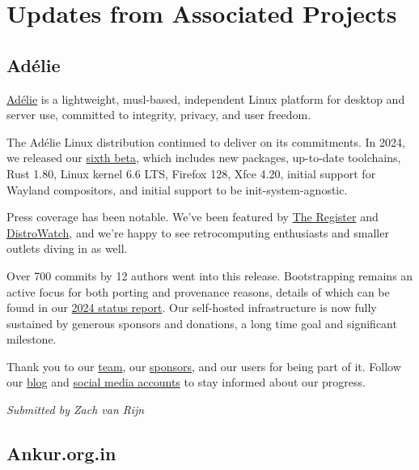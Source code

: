 \documentclass[a4paper]{report}
\begin{document}
\section{Updates from Associated Projects}

\subsection{Adélie}

\href{https://www.adelielinux.org/}{Adélie} is a lightweight, musl-based, independent Linux platform for desktop and server use, committed to integrity, privacy, and user freedom.

The Adélie Linux distribution continued to deliver on its commitments. In 2024, we released our \href{https://blog.adelielinux.org/2024/12/15/adelie-linux-1-0-beta6-released/}{sixth beta}, which includes new packages, up-to-date toolchains, Rust 1.80, Linux kernel 6.6 LTS, Firefox 128, Xfce 4.20, initial support for Wayland compositors, and initial support to be init-system-agnostic.

Press coverage has been notable. We’ve been featured by \href{https://www.theregister.com/2024/12/20/adelie_linux_1_beta_6/}{The Register} and \href{https://distrowatch.com/weekly.php?issue=20240212}{DistroWatch}, and we’re happy to see retrocomputing enthusiasts and smaller outlets diving in as well.

Over 700 commits by 12 authors went into this release. Bootstrapping remains an active focus for both porting and provenance reasons, details of which can be found in our \href{https://blog.adelielinux.org/2024/12/24/2024-state-of-the-adelie-linux-distribution/}{2024 status report}.
Our self-hosted infrastructure is now fully sustained by generous sponsors and donations, a long time goal and significant milestone.

Thank you to our \href{https://git.adelielinux.org/groups/adelie/-/group_members}{team}, our \href{https://www.adelielinux.org/sponsors/}{sponsors}, and our users for being part of it.  Follow our \href{https://blog.adelielinux.org/}{blog} and \href{https://www.adelielinux.org/contact/}{social media accounts} to stay informed about our progress.

{\em Submitted by Zach van Rijn}

\subsection{Ankur.org.in}
\end{document}
